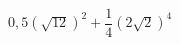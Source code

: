 \begin{ex}[type=calculate]
	\begin{condition}
		\( 0,5(\sqrt{12})^2+\dfrac{1}{4}(2\sqrt{2})^4 \)
	\end{condition}
\end{ex}